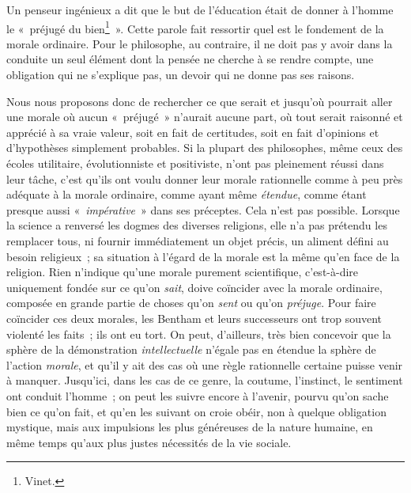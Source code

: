 \documentclass[french,twoside]{book} %
\begin{document}
\noindent Un penseur ingénieux a dit que le but de l’éducation était de donner à l’homme le « préjugé du bien\footnote{Vinet.} ». Cette parole fait ressortir quel est le fondement de la morale ordinaire. Pour le philosophe, au contraire, il ne doit pas y avoir dans la conduite un seul élément dont la pensée ne cherche à se rendre compte, une obligation qui ne s’explique pas, un devoir qui ne donne pas ses raisons.\par
Nous nous proposons donc de rechercher ce que serait et jusqu’où pourrait aller une morale où aucun « préjugé » n’aurait aucune part, où tout serait raisonné et apprécié à sa vraie valeur, soit en fait de certitudes, soit en fait d’opinions et d’hypothèses simplement probables. Si la plupart des philosophes, même ceux des écoles utilitaire, évolutionniste et positiviste, n’ont pas pleinement réussi dans leur tâche, c’est qu’ils ont voulu donner leur morale rationnelle comme à peu près adéquate à la morale ordinaire, comme ayant même \emph{étendue}, comme étant presque aussi « \emph{impérative} » dans ses préceptes. Cela n’est pas possible. Lorsque la science a renversé les dogmes des diverses religions, elle n’a pas prétendu les remplacer tous, ni fournir immédiatement un objet précis, un aliment défini au besoin religieux ; sa situation à l’égard de la morale est la même qu’en face de la religion. Rien n’indique qu’une morale purement scientifique, c’est-à-dire uniquement fondée sur ce qu’on \emph{sait}, doive coïncider avec la morale ordinaire, composée en grande partie de choses qu’on \emph{sent} ou qu’on \emph{préjuge}. Pour faire coïncider ces deux morales, les Bentham et leurs successeurs ont trop souvent violenté les faits ; ils ont eu tort. On peut, d’ailleurs, très bien concevoir que la sphère de la démonstration \emph{intellectuelle} n’égale pas en étendue la sphère de l’action \emph{morale}, et qu’il y ait des cas où une règle rationnelle certaine puisse venir à manquer. Jusqu’ici, dans les cas de ce genre, la coutume, l’instinct, le sentiment ont conduit l’homme ; on peut les suivre encore à l’avenir, pourvu qu’on sache bien ce qu’on fait, et qu’en les suivant on croie obéir, non à quelque obligation mystique, mais aux impulsions les plus généreuses de la nature humaine, en même temps qu’aux plus justes nécessités de la vie sociale.\par
\end{document}

